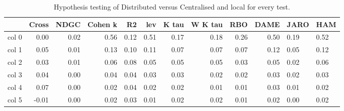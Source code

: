 \begin{table}[h]
\centering
\caption{Hypothesis testing of Distributed versus Centralised and local for every test.}
\label{tab:hyp}
\begin{tabular}{l|r|r|r|r|r|r|r|r|r}
\toprule
 & Cross & NDGC & Cohen k & R2 & lev & K tau & W K tau & RBO & DAME & JARO & HAM \\
\midrule
col 0 & {} 0.00 & 0.02 & {} 0.56 & 0.12 & 0.51 & 0.17 & 0.18 & 0.26 & 0.50 & 0.19 & 0.52 \\
col 1 & 0.05 & {} 0.01 & {} 0.13 & 0.10 & 0.11 & 0.07 & 0.07 & 0.07 & 0.12 & 0.05 & 0.12 \\
col 2 & 0.03 & {} 0.01 & 0.06 & {} 0.08 & 0.05 & 0.05 & 0.05 & 0.03 & 0.05 & 0.02 & 0.06 \\
col 3 & {} 0.04 & {} 0.00 & 0.04 & 0.04 & 0.03 & 0.03 & 0.02 & 0.02 & 0.03 & 0.02 & 0.03 \\
col 4 & {} 0.07 & {} 0.00 & 0.02 & 0.04 & 0.02 & 0.02 & 0.01 & 0.01 & 0.03 & 0.01 & 0.02 \\
col 5 & {} -0.01 & 0.00 & 0.02 & {} 0.03 & 0.01 & 0.02 & 0.02 & 0.01 & 0.02 & 0.00 & 0.02 \\
\bottomrule
\end{tabular}
\end{table}
